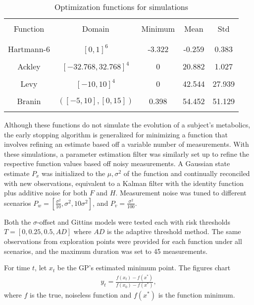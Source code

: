 \begin{table}[t]
\centering
\begin{tabular}{ |c | c | c | c | c | }
  \hline&&&&\\
  Function & Domain & Minimum & Mean & Std\\
  &&&&\\
  \hline
  &&&&\\
  Hartmann-6 & $[0,1]^6$ & -3.322 & -0.259 & 0.383\\
  &&&&\\
  Ackley & $[-32.768, 32.768]^4$ & 0 & 20.882 & 1.027\\
  &&&&\\
  Levy & $[-10, 10]^4$ & 0 & 42.544 & 27.939\\
  &&&&\\
  Branin & $([-5, 10],[0, 15])$ & 0.398 & 54.452 & 51.129\\
  &&&&\\
  \hline
\end{tabular}
\caption{Optimization functions for simulations}
\label{tab:optfunc}
\end{table}

Although these functions do not simulate the evolution of a subject's metabolics, the early stopping algorithm is generalized for minimizing a function that involves refining an estimate based off a variable number of measurements. With these simulations, a parameter estimation filter was similarly set up to refine the respective function values based off noisy measurements. A Gaussian state estimate $P_x$ was initialized to the $\mu, \sigma^2$ of the function and continually reconciled with new observations, equivalent to a Kalman filter with the identity function plus additive noise for both $F$ and $H$. Measurement noise was tuned to different scenarios $P_w=[\frac{\sigma^2}{10}, \sigma^2, 10\sigma^2]$, and $P_v=\frac{\sigma^2}{100}$. 

Both the $\sigma$-offset and Gittins models were tested each with risk thresholds $T=[0, 0.25, 0.5, AD]$ where $AD$ is the adaptive threshold method. The same observations from exploration points were provided for each function under all scenarios, and the maximum duration was set to 45 measurements.

For time $t$, let $x_t$ be the GP's estimated minimum point. The figures chart
\begin{align}
  y_t = \frac{f(x_t) - f(x^*)}{f(x_0) - f(x^*)},
\end{align}
where $f$ is the true, noiseless function and $f(x^*)$ is the function minimum.

